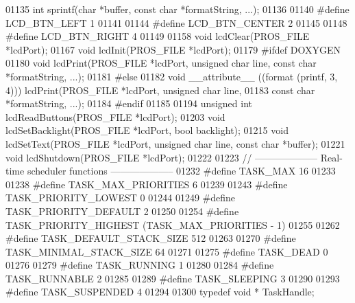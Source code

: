 \begin{DoxyCode}
01135 \textcolor{keywordtype}{int} sprintf(\textcolor{keywordtype}{char} *buffer, \textcolor{keyword}{const} \textcolor{keywordtype}{char} *formatString, ...);
01136 
01140 \textcolor{preprocessor}{#define LCD\_BTN\_LEFT 1}
01141 
01144 \textcolor{preprocessor}{#define LCD\_BTN\_CENTER 2}
01145 
01148 \textcolor{preprocessor}{#define LCD\_BTN\_RIGHT 4}
01149 
01158 \textcolor{keywordtype}{void} lcdClear(PROS\_FILE *lcdPort);
01167 \textcolor{keywordtype}{void} lcdInit(PROS\_FILE *lcdPort);
01179 \textcolor{preprocessor}{#ifdef DOXYGEN}
01180 \textcolor{keywordtype}{void} lcdPrint(PROS\_FILE *lcdPort, \textcolor{keywordtype}{unsigned} \textcolor{keywordtype}{char} line, \textcolor{keyword}{const} \textcolor{keywordtype}{char} *formatString, ...);
01181 \textcolor{preprocessor}{#else}
01182 \textcolor{keywordtype}{void} __attribute__ ((format (printf, 3, 4))) lcdPrint(PROS\_FILE *lcdPort, \textcolor{keywordtype}{unsigned} \textcolor{keywordtype}{char} 
      line,
01183     const \textcolor{keywordtype}{char} *formatString, ...);
01184 \textcolor{preprocessor}{#endif}
01185 
01194 \textcolor{keywordtype}{unsigned} \textcolor{keywordtype}{int} lcdReadButtons(PROS\_FILE *lcdPort);
01203 \textcolor{keywordtype}{void} lcdSetBacklight(PROS\_FILE *lcdPort, \textcolor{keywordtype}{bool} backlight);
01215 \textcolor{keywordtype}{void} lcdSetText(PROS\_FILE *lcdPort, \textcolor{keywordtype}{unsigned} \textcolor{keywordtype}{char} line, \textcolor{keyword}{const} \textcolor{keywordtype}{char} *buffer);
01221 \textcolor{keywordtype}{void} lcdShutdown(PROS\_FILE *lcdPort);
01222 
01223 \textcolor{comment}{// -------------------- Real-time scheduler functions --------------------}
01232 \textcolor{comment}{}\textcolor{preprocessor}{#define TASK\_MAX 16}
01233 
01238 \textcolor{preprocessor}{#define TASK\_MAX\_PRIORITIES 6}
01239 
01243 \textcolor{preprocessor}{#define TASK\_PRIORITY\_LOWEST 0}
01244 
01249 \textcolor{preprocessor}{#define TASK\_PRIORITY\_DEFAULT 2}
01250 
01254 \textcolor{preprocessor}{#define TASK\_PRIORITY\_HIGHEST (TASK\_MAX\_PRIORITIES - 1)}
01255 
01262 \textcolor{preprocessor}{#define TASK\_DEFAULT\_STACK\_SIZE 512}
01263 
01270 \textcolor{preprocessor}{#define TASK\_MINIMAL\_STACK\_SIZE 64}
01271 
01275 \textcolor{preprocessor}{#define TASK\_DEAD 0}
01276 
01279 \textcolor{preprocessor}{#define TASK\_RUNNING 1}
01280 
01284 \textcolor{preprocessor}{#define TASK\_RUNNABLE 2}
01285 
01289 \textcolor{preprocessor}{#define TASK\_SLEEPING 3}
01290 
01293 \textcolor{preprocessor}{#define TASK\_SUSPENDED 4}
01294 
01300 \textcolor{keyword}{typedef} \textcolor{keywordtype}{void} * TaskHandle;

\end{DoxyCode}

